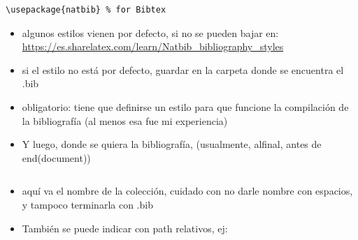 \documentclass[11pt,]{book}
\providecommand{\tightlist}{%
  \setlength{\itemsep}{0pt}\setlength{\parskip}{0pt}}
\begin{document}
\begin{verbatim}
\usepackage{natbib} % for Bibtex

\end{verbatim}

\begin{itemize}
\tightlist
\item
  algunos estilos vienen por defecto, si no se pueden bajar en: \url{https://es.sharelatex.com/learn/Natbib_bibliography_styles}
\item
  si el estilo no está por defecto, guardar en la carpeta donde se encuentra el .bib
\item
  obligatorio: tiene que definirse un estilo para que funcione la compilación de la bibliografía (al menos esa fue mi experiencia)
\item
  Y luego, donde se quiera la bibliografía, (usualmente, alfinal, antes de end(document))
\end{itemize}

\begin{verbatim}

\end{verbatim}

\begin{itemize}
\tightlist
\item
  aquí va el nombre de la colección, cuidado con no darle nombre con espacios, y tampoco terminarla con .bib
\item
  También se puede indicar con path relativos, ej:
\end{itemize}

\begin{verbatim}
 
\end{verbatim}
\end{document}
